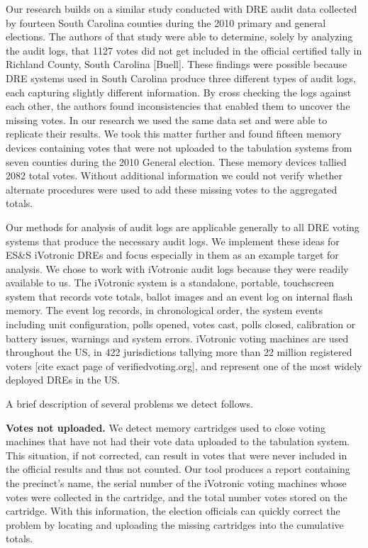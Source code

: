 Our research builds on a similar study conducted with DRE audit data collected by fourteen South Carolina counties during the 2010 primary and general elections.  The authors of that study were able to determine, solely by analyzing the audit logs, that 1127 votes did not get included in the official certified tally in Richland County, South Carolina [Buell]. These findings were possible because DRE systems used in South Carolina produce three different types of audit logs, each capturing slightly different information. By cross checking the logs against each other, the authors found inconsistencies that enabled them to uncover the missing votes. In our research we used the same data set and were able to replicate their results. We took this matter further and found fifteen memory devices containing votes that were not uploaded to the tabulation systems from seven counties during the 2010 General election. These memory devices tallied 2082 total votes. Without additional information we could not verify whether alternate procedures were used to add these missing votes to the aggregated totals. 

Our methods for analysis of audit logs are applicable generally to all DRE voting systems  that produce the necessary audit logs. We implement these ideas for ES\&S iVotronic  DREs and focus especially in them as an example target for analysis.  We chose to work with iVotronic audit logs because they were readily available to us. The iVotronic system is a standalone, portable, touchscreen system that records vote totals, ballot images and an event log on internal flash memory. The event log records, in chronological order, the system events including unit configuration, polls opened, votes cast, polls closed, calibration or battery issues, warnings and system errors. iVotronic voting machines are used throughout the US, in 422 jurisdictions tallying more than 22 million registered voters [cite exact page of verifiedvoting.org], and represent one of the most widely deployed DREs in the US.
 
A brief description of several problems we detect follows.

\textbf{Votes not uploaded.} We detect  memory cartridges used to close voting machines that have not had their vote data uploaded to the tabulation system. This situation, if not corrected, can result in votes that were never included in the official results and thus not counted. Our tool produces a report containing the precinct's name, the serial number of the iVotronic voting machines whose votes were collected in the cartridge, and the total number votes stored on the cartridge. With this information, the election officials can quickly correct the problem by locating and uploading the missing cartridges into the cumulative totals.

